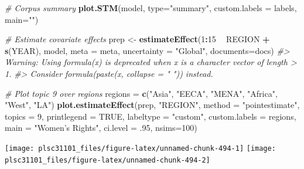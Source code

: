 \documentclass[]{book}
\newenvironment{Shaded}{\begin{snugshade}}{\end{snugshade}}
\newcommand{\KeywordTok}[1]{\textcolor[rgb]{0.13,0.29,0.53}{\textbf{#1}}}
\newcommand{\DataTypeTok}[1]{\textcolor[rgb]{0.13,0.29,0.53}{#1}}
\newcommand{\DecValTok}[1]{\textcolor[rgb]{0.00,0.00,0.81}{#1}}
\newcommand{\StringTok}[1]{\textcolor[rgb]{0.31,0.60,0.02}{#1}}
\newcommand{\CommentTok}[1]{\textcolor[rgb]{0.56,0.35,0.01}{\textit{#1}}}
\newcommand{\OtherTok}[1]{\textcolor[rgb]{0.56,0.35,0.01}{#1}}
\newcommand{\OperatorTok}[1]{\textcolor[rgb]{0.81,0.36,0.00}{\textbf{#1}}}
\newcommand{\NormalTok}[1]{#1}
\begin{document}
\begin{Shaded}
\begin{Highlighting}[]
\CommentTok{# Corpus summary}
\KeywordTok{plot.STM}\NormalTok{(model, }\DataTypeTok{type=}\StringTok{"summary"}\NormalTok{, }\DataTypeTok{custom.labels =}\NormalTok{ labels, }\DataTypeTok{main=}\StringTok{""}\NormalTok{)}

\CommentTok{# Estimate covariate effects}
\NormalTok{prep <-}\StringTok{ }\KeywordTok{estimateEffect}\NormalTok{(}\DecValTok{1}\OperatorTok{:}\DecValTok{15} \OperatorTok{~}\StringTok{ }\NormalTok{REGION }\OperatorTok{+}\StringTok{ }\KeywordTok{s}\NormalTok{(YEAR), model, }\DataTypeTok{meta =}\NormalTok{ meta, }\DataTypeTok{uncertainty =} \StringTok{"Global"}\NormalTok{, }\DataTypeTok{documents=}\NormalTok{docs)}
\CommentTok{#> Warning: Using formula(x) is deprecated when x is a character vector of length > 1.}
\CommentTok{#>   Consider formula(paste(x, collapse = " ")) instead.}

\CommentTok{# Plot topic 9 over regions}
\NormalTok{regions =}\StringTok{ }\KeywordTok{c}\NormalTok{(}\StringTok{"Asia"}\NormalTok{, }\StringTok{"EECA"}\NormalTok{, }\StringTok{"MENA"}\NormalTok{, }\StringTok{"Africa"}\NormalTok{, }\StringTok{"West"}\NormalTok{, }\StringTok{"LA"}\NormalTok{)}
\KeywordTok{plot.estimateEffect}\NormalTok{(prep, }\StringTok{"REGION"}\NormalTok{, }\DataTypeTok{method =} \StringTok{"pointestimate"}\NormalTok{, }\DataTypeTok{topics =} \DecValTok{9}\NormalTok{, }\DataTypeTok{printlegend =} \OtherTok{TRUE}\NormalTok{, }\DataTypeTok{labeltype =} \StringTok{"custom"}\NormalTok{, }\DataTypeTok{custom.labels =}\NormalTok{ regions, }\DataTypeTok{main =} \StringTok{"Women's Rights"}\NormalTok{, }\DataTypeTok{ci.level =}\NormalTok{ .}\DecValTok{95}\NormalTok{, }\DataTypeTok{nsims=}\DecValTok{100}\NormalTok{)}
\end{Highlighting}
\end{Shaded}

\begin{center}\texttt{[image: plsc31101\_files/figure-latex/unnamed-chunk-494-1]} \texttt{[image: plsc31101\_files/figure-latex/unnamed-chunk-494-2]} \end{center}
\end{document}
